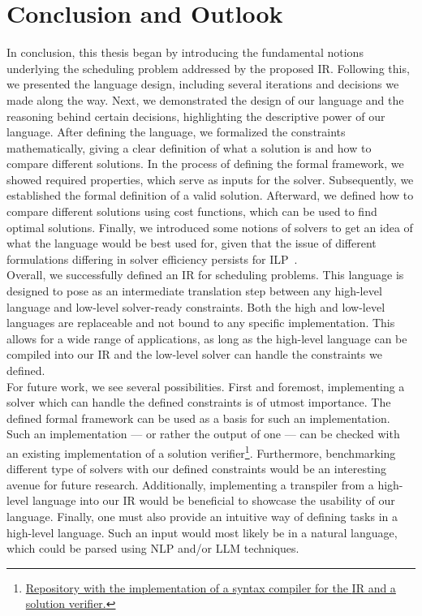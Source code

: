\cleardoubleoddpage%
\chapter{Conclusion and Outlook}
\label{chapter:conclusion}
In conclusion, this thesis began by introducing the fundamental notions underlying the scheduling problem addressed by the proposed \ac{IR}. Following this, we presented the language design, including several iterations and decisions we made along the way. Next, we demonstrated the design of our language and the reasoning behind certain decisions, highlighting the descriptive power of our language. After defining the language, we formalized the constraints mathematically, giving a clear definition of what a solution is and how to compare different solutions. In the process of defining the formal framework, we showed required properties, which serve as inputs for the solver. Subsequently, we established the formal definition of a valid solution. Afterward, we defined how to compare different solutions using cost functions, which can be used to find optimal solutions. Finally, we introduced some notions of solvers to get an idea of what the language would be best used for, given that the issue of different formulations differing in solver efficiency persists for \ac{ILP}~\cite{bib:1994-chaudhuri}. \\
Overall, we successfully defined an \Ac{IR} for scheduling problems. This language is designed to pose as an intermediate translation step between any high-level language and low-level solver-ready constraints. Both the high and low-level languages are replaceable and not bound to any specific implementation. This allows for a wide range of applications, as long as the high-level language can be compiled into our \Ac{IR} and the low-level solver can handle the constraints we defined. \\
For future work, we see several possibilities. First and foremost, implementing a solver which can handle the defined constraints is of utmost importance. The defined formal framework can be used as a basis for such an implementation. Such an implementation --- or rather the output of one --- can be checked with an existing implementation of a solution verifier\footnote{\href{https://github.com/h0p3zZ/BScThesis/tree/dev/_prog}{Repository with the implementation of a syntax compiler for the \Ac{IR} and a solution verifier.}}. Furthermore, benchmarking different type of solvers with our defined constraints would be an interesting avenue for future research. Additionally, implementing a transpiler from a high-level language into our \Ac{IR} would be beneficial to showcase the usability of our language. Finally, one must also provide an intuitive way of defining tasks in a high-level language. Such an input would most likely be in a natural language, which could be parsed using \ac{NLP} and/or \ac{LLM} techniques.

